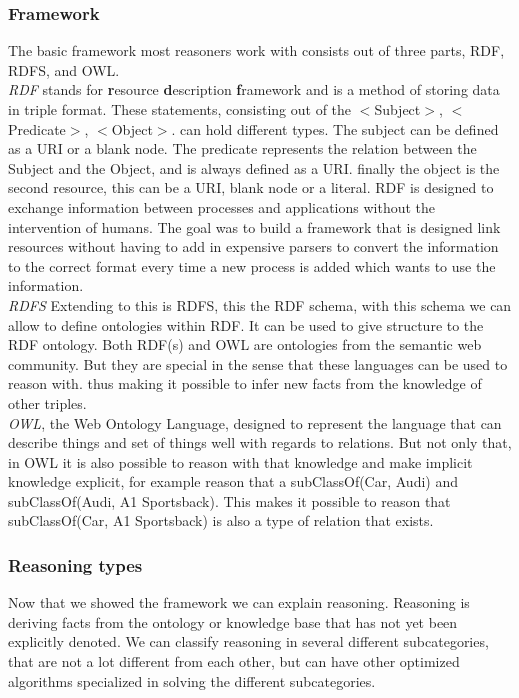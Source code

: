 \documentclass{article}
\begin{document}
\subsubsection{Framework}
The basic framework most reasoners work with consists out of three parts, RDF, RDFS, and OWL. \\

\textit{RDF} \cite{rdfPrimer:2014} stands for \textbf{r}esource \textbf{d}escription \textbf{f}ramework and is a method of storing data in triple format. These statements, consisting out of the $<$Subject$>$, $<$Predicate$>$, $<$Object$>$. can hold different types. The subject can be defined as a URI or a blank node. The predicate represents the relation between the Subject and the Object, and is always defined as a URI. finally the object is the second resource, this can be a URI, blank node or a literal.
RDF is designed to exchange information between processes and applications without the intervention of humans. The goal was to build a framework that is designed link resources without having to add in expensive parsers to convert the information to the correct format every time a new process is added which wants to use the information.\\

\textit{RDFS} \cite{} Extending to this is RDFS, this the RDF schema, with this schema we can allow to define ontologies within RDF. It can be used to give structure to the RDF ontology. Both RDF(s) and OWL are ontologies from the semantic web community. But they are special in the sense that these languages can be used to reason with. thus making it possible to infer new facts from the knowledge of other triples.\\

\textit{OWL}\cite{OWLPrimer:2012}, the Web Ontology Language, designed to represent the language that can describe things and set of things well with regards to relations. But not only that, in OWL it is also possible to reason with that knowledge and make implicit knowledge explicit, for example reason that a subClassOf(Car, Audi) and subClassOf(Audi, A1 Sportsback). This makes it possible to reason that subClassOf(Car, A1 Sportsback) is also a type of relation that exists. 

\subsubsection{Reasoning types}
Now that we showed the framework we can explain reasoning. Reasoning is deriving facts from the ontology or knowledge base that has not yet been explicitly denoted. We can classify reasoning in several different subcategories, that are not a lot different from each other, but can have other optimized algorithms specialized in solving the different subcategories.
\end{document}
